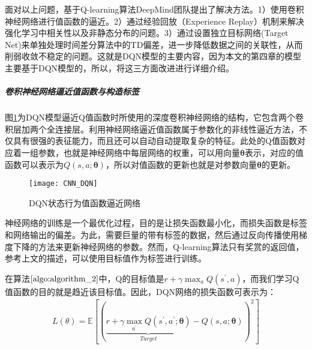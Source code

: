 面对以上问题，基于Q-learning算法DeepMind团队提出了解决方法。1）使用卷积神经网络进行值函数的逼近。2）通过经验回放（Experience Replay）机制来解决强化学习中相关性以及非静态分布的问题。3）通过设置独立目标网络(Target Net)来单独处理时间差分算法中的TD偏差，进一步降低数据之间的关联性，从而削弱收敛不稳定的问题。这就是DQN模型的主要内容，因为本文的第四章的模型主要基于DQN模型的，所以，将这三方面改进进行详细介绍。


 \subparagraph{卷积神经网络逼近值函数与构造标签}
图\ref{fig:CNN_DQN}为DQN模型逼近Q值函数时所使用的深度卷积神经网络的结构，它包含两个卷积层加两个全连接层。利用神经网络逼近值函数属于参数化的非线性逼近方法，不仅具有很强的表征能力，而且还可以自动自动提取复杂的特征。此处的Q值函数对应着一组参数，也就是神经网络中每层网络的权重，可以用向量$\bm{\theta}$表示，对应的值函数可以表示为$Q(s,a;\bm{\theta})$，所以对值函数的更新也就是对参数向量$\bm{\theta}$的更新。
\begin{figure}[htbp]
\centering
\texttt{[image: CNN\_DQN]}
\caption{DQN状态行为值函数逼近网络}
\label{fig:CNN_DQN}
\end{figure}

神经网络的训练是一个最优化过程，目的是让损失函数最小化，而损失函数是标签和网络输出的偏差。为此，需要巨量的带有标签的数据，然后通过反向传播使用梯度下降的方法来更新神经网络的参数。然而，Q-learning算法只有奖赏的返回值，参考上文的描述，可以使用目标值作为标签进行训练。

在算法$\ref{algo:algorithm_2}$中，Q的目标值是$r+\gamma \max_{a}Q(s^{'},a)$，而我们学习Q值函数的目的就是趋近该目标值。因此，DQN网络的损失函数可表示为：
\begin{equation}
\label{seq_3_2_1}
\begin{aligned}
L(\theta)=\mathbb{E}[(\underbrace{r+\gamma\max_{a^{'}} Q(s^{'},a^{'};\bm{\theta})}_{Target}-Q(s,a;\bm{\theta}))^{2}]
\end{aligned}
\end{equation}


